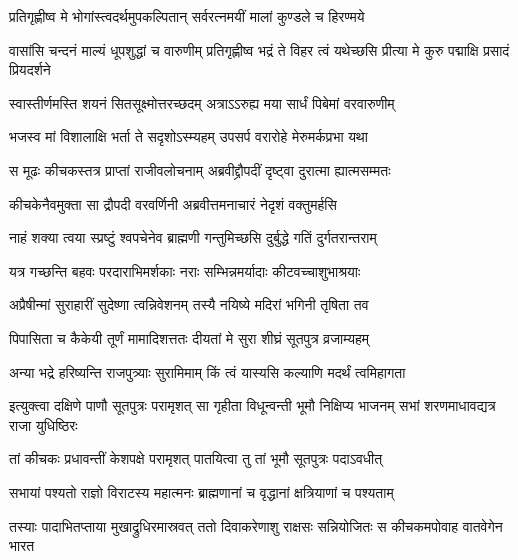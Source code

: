 \twolineshloka
{प्रतिगृह्णीष्व मे भोगांस्त्वदर्थमुपकल्पितान्}
{सर्वरत्नमयीं मालां कुण्डले च हिरण्मये}





\threelineshloka
{वासांसि चन्दनं माल्यं धूपशुद्धां च वारुणीम्}
{प्रतिगृह्णीष्व भद्रं ते विहर त्वं यथेच्छसि}
{प्रीत्या मे कुरु पद्माक्षि प्रसादं प्रियदर्शने}


\twolineshloka
{स्वास्तीर्णमस्ति शयनं सितसूक्ष्मोत्तरच्छदम्}
{अत्राऽऽरुह्य मया सार्धं पिबेमां वरवारुणीम्}


\twolineshloka
{भजस्व मां विशालाक्षि भर्ता ते सदृशोऽस्म्यहम्}
{उपसर्प वरारोहे मेरुमर्कप्रभा यथा}



\twolineshloka
{स मूढः कीचकस्तत्र प्राप्तां राजीवलोचनाम्}
{अब्रवीद्द्रौपदीं दृष्ट्वा दुरात्मा ह्यात्मसम्मतः}


\twolineshloka
{कीचकेनैवमुक्ता सा द्रौपदी वरवर्णिनी}
{अब्रवीत्तमनाचारं नेदृशं वक्तुमर्हसि}


\twolineshloka
{नाहं शक्या त्वया स्प्रष्टुं श्वपचेनेव ब्राह्मणी}
{गन्तुमिच्छसि दुर्बुद्धे गतिं दुर्गतरान्तराम्}


\twolineshloka
{यत्र गच्छन्ति बहवः परदाराभिमर्शकाः}
{नराः सम्भिन्नमर्यादाः कीटवच्चाशुभाश्रयाः}


\twolineshloka
{अप्रैषीन्मां सुराहारीं सुदेष्णा त्वन्निवेशनम्}
{तस्यै नयिष्ये मदिरां भगिनी तृषिता तव}


\twolineshloka
{पिपासिता च कैकेयी तूर्णं मामादिशत्ततः}
{दीयतां मे सुरा शीघ्रं सूतपुत्र व्रजाम्यहम्}




\twolineshloka
{अन्या भद्रे हरिष्यन्ति राजपुत्र्याः सुरामिमाम्}
{किं त्वं यास्यसि कल्याणि मदर्थं त्वमिहागता}



\threelineshloka
{इत्युक्त्वा दक्षिणे पाणौ सूतपुत्रः परामृशत्}
{सा गृहीता विधून्वन्ती भूमौ निक्षिप्य भाजनम्}
{सभां शरणमाधावद्यत्र राजा युधिष्ठिरः}


\twolineshloka
{तां कीचकः प्रधावन्तीं केशपक्षे परामृशत्}
{पातयित्वा तु तां भूमौ सूतपुत्रः पदाऽवधीत्}


\twolineshloka
{सभायां पश्यतो राज्ञो विराटस्य महात्मनः}
{ब्राह्मणानां च वृद्धानां क्षत्रियाणां च पश्यताम्}


\onelineshloka
{तस्याः पादाभितप्ताया मुखाद्रुधिरमास्रवत्}
\twolineshloka
{ततो दिवाकरेणाशु राक्षसः सन्नियोजितः}
{स कीचकमपोवाह वातवेगेन भारत}



